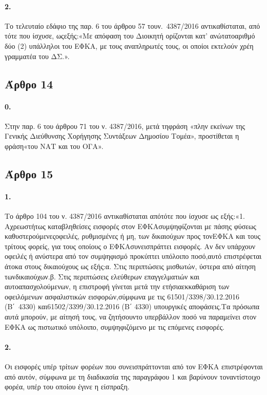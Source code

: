 \documentclass[a4paper,oneside, 10pt]{book}
\begin{document}
\paragraph { 2. } Το τελευταίο εδάφιο της παρ. 6 του άρθρου 57 τουν. 4387/2016 αντικαθίσταται, από τότε που ίσχυσε, ωςεξής:«Με απόφαση του Διοικητή ορίζονται κατ’ ανώτατοαριθμό δύο (2) υπάλληλοι του ΕΦΚΑ, με τους αναπληρωτές τους, οι οποίοι εκτελούν χρέη γραμματέα του ΔΣ.».
\subsection*{ Άρθρο 14 }
\paragraph { 0. } Στην παρ. 6 του άρθρου 71 του ν. 4387/2016, μετά τηφράση «πλην εκείνων της Γενικής Διεύθυνσης Χορήγησης Συντάξεων Δημοσίου Τομέα», προστίθεται η φράση«του ΝΑΤ και του ΟΓΑ».
\subsection*{ Άρθρο 15 }
\paragraph { 1. } Το άρθρο 104 του ν. 4387/2016 αντικαθίσταται απότότε που ίσχυσε ως εξής:«1. Αχρεωστήτως καταβληθείσες εισφορές στον ΕΦΚΑσυμψηφίζονται με πάσης φύσεως καθυστερούμενεςοφειλές, ρυθμισμένες ή μη, των δικαιούχων προς τονΕΦΚΑ και τους τρίτους φορείς, για τους οποίους ο ΕΦΚΑσυνεισπράττει εισφορές. Αν δεν υπάρχουν οφειλές ή ανύστερα από τον συμψηφισμό προκύπτει υπόλοιπο ποσό,αυτό επιστρέφεται άτοκα στους δικαιούχους ως εξής:α. Στις περιπτώσεις μισθωτών, ύστερα από αίτηση τωνδικαιούχων.β. Στις περιπτώσεις ελεύθερων επαγγελματιών και αυτοαπασχολούμενων, η επιστροφή γίνεται μετά την ετήσιαεκκαθάριση των οφειλόμενων ασφαλιστικών εισφορών,σύμφωνα με τις 61501/3398/30.12.2016 (Β΄ 4330) και61502/3399/30.12.2016 (Β΄ 4330) υπουργικές αποφάσεις.Τα πρόσωπα αυτά μπορούν, με αίτησή τους, να ζητήσουντο υπερβάλλον ποσό να παραμείνει στον ΕΦΚΑ ως πιστωτικό υπόλοιπο, συμψηφιζόμενο με τις επόμενες εισφορές.
\paragraph { 2. } Οι εισφορές υπέρ τρίτων φορέων που συνεισπράττονται από τον ΕΦΚΑ επιστρέφονται από αυτόν, σύμφωνα με τη διαδικασία της παραγράφου 1 και βαρύνουν τοναντίστοιχο φορέα, υπέρ του οποίου έγινε η είσπραξη.
\end{document}
